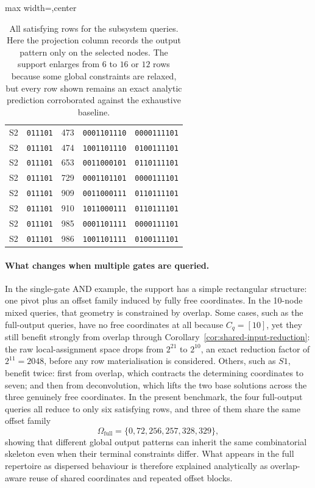 \documentclass[11pt]{article}
\theoremstyle{definition}
\begin{document}
\begin{table}[H]
\begin{adjustbox}{max width=\textwidth,center}
\begin{tabular}{@{}lcrcc@{}}
S2 & \texttt{011101} & 473 & \texttt{0001101110} & \texttt{0000111101} \\
S2 & \texttt{011101} & 474 & \texttt{1001101110} & \texttt{0100111101} \\
S2 & \texttt{011101} & 653 & \texttt{0011000101} & \texttt{0110111101} \\
S2 & \texttt{011101} & 729 & \texttt{0001101101} & \texttt{0000111101} \\
S2 & \texttt{011101} & 909 & \texttt{0011000111} & \texttt{0110111101} \\
S2 & \texttt{011101} & 910 & \texttt{1011000111} & \texttt{0110111101} \\
S2 & \texttt{011101} & 985 & \texttt{0001101111} & \texttt{0000111101} \\
S2 & \texttt{011101} & 986 & \texttt{1001101111} & \texttt{0100111101} \\
\bottomrule
\end{tabular}
\end{adjustbox}
\caption{All satisfying rows for the subsystem queries. Here the projection column records the output pattern only on the selected nodes. The support enlarges from \(6\) to \(16\) or \(12\) rows because some global constraints are relaxed, but every row shown remains an exact analytic prediction corroborated against the exhaustive baseline.}
\label{tab:mixed10-subsystem-rows}
\end{table}

\paragraph{What changes when multiple gates are queried.}
In the single-gate AND example, the support has a simple rectangular structure: one pivot plus an offset family induced by fully free coordinates. In the 10-node mixed queries, that geometry is constrained by overlap. Some cases, such as the full-output queries, have no free coordinates at all because \(C_q=[10]\), yet they still benefit strongly from overlap through Corollary~\ref{cor:shared-input-reduction}: the raw local-assignment space drops from \(2^{21}\) to \(2^{10}\), an exact reduction factor of \(2^{11}=2048\), before any row materialisation is considered. Others, such as \(S1\), benefit twice: first from overlap, which contracts the determining coordinates to seven; and then from deconvolution, which lifts the two base solutions across the three genuinely free coordinates. In the present benchmark, the four full-output queries all reduce to only six satisfying rows, and three of them share the same offset family
\[
\Omega_{\mathrm{full}}=\{0,72,256,257,328,329\},
\]
showing that different global output patterns can inherit the same combinatorial skeleton even when their terminal constraints differ. What appears in the full repertoire as dispersed behaviour is therefore explained analytically as overlap-aware reuse of shared coordinates and repeated offset blocks.
\end{document}
